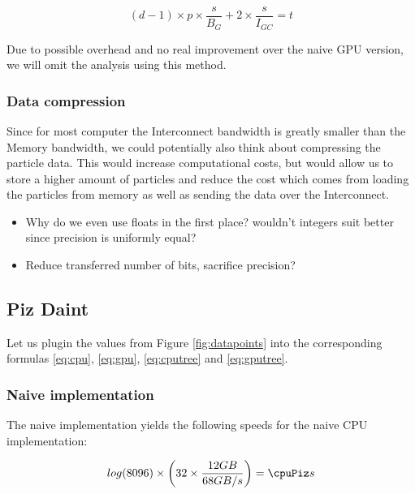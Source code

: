\documentclass[]{article}
\begin{document}
\begin{center}
	\begin{equation}
		(d-1) \times p \times \frac{s}{B_{G}} + 2 \times \frac{s}{I_{GC}} = t
		\label{eq:gpubatch}
	\end{equation}
\end{center}

Due to possible overhead and no real improvement over the naive GPU version, we will omit the analysis using this method.

\subsubsection{Data compression}

Since for most computer the Interconnect bandwidth is greatly smaller than the Memory bandwidth, we could potentially also think about compressing the particle data. This would increase computational costs, but would allow us to store a higher amount of particles and reduce the cost which comes from loading the particles from memory as well as sending the data over the Interconnect.

\begin{itemize}
	\item Why do we even use floats in the first place? wouldn't integers suit better since precision is uniformly equal?
	\item Reduce transferred number of bits, sacrifice precision?
\end{itemize}



\normalfont
\subsection{Piz Daint} 

Let us plugin the values from Figure \ref{fig:datapoints} into the corresponding formulas \ref{eq:cpu}, \ref{eq:gpu}, \ref{eq:cputree} and \ref{eq:gputree}.

\subsubsection{Naive implementation}
The naive implementation yields the following speeds for the naive CPU  implementation:

\pgfmathsetmacro{}

\begin{center}
	\begin{equation}
		log(\d) \times \left ( \p \times \frac{ \s GB }{68 GB/s} \right )  = \cpuPiz s
	\end{equation}
\end{center}
\end{document}
